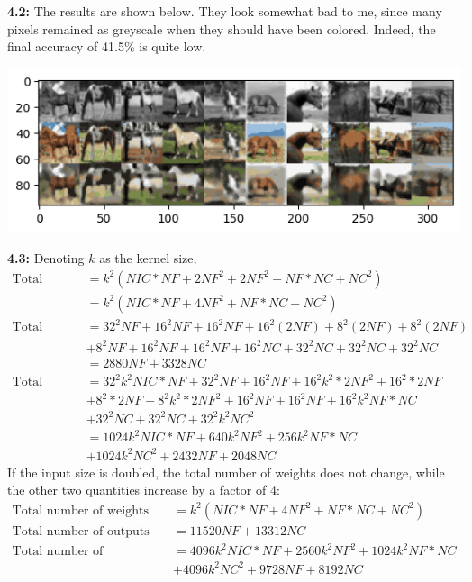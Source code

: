 \documentclass[12pt]{article}
\begin{document}
\textbf{4.2:} The results are shown below. They look somewhat bad to me, since many pixels remained as greyscale when they should have been colored. Indeed, the final accuracy of 41.5\% is quite low.
\begin{center}
    \includegraphics[scale=.75]{4.2.png}
\end{center}

\textbf{4.3:} Denoting $k$ as the kernel size, \begin{align*}
    \text{Total number of weights} &= k^2(NIC*NF + 2NF^2 + 2NF^2 + NF*NC + NC^2)\\
    &= k^2(NIC*NF + 4NF^2 + NF*NC + NC^2)\\
    \text{Total number of outputs} &= 32^2NF + 16^2NF + 16^2NF + 16^2(2NF) + 8^2(2NF) + 8^2(2NF)\\
    &+ 8^2NF + 16^2NF + 16^2NF + 16^2NC + 32^2NC + 32^2NC + 32^2NC\\
    &= 2880NF + 3328NC\\
    \text{Total number of connections} &= 32^2k^2NIC*NF + 32^2NF + 16^2NF + 16^2k^2*2NF^2 + 16^2*2NF\\
    &+ 8^2*2NF + 8^2k^2*2NF^2 + 16^2NF + 16^2NF + 16^2k^2NF*NC\\
    &+ 32^2NC + 32^2NC + 32^2k^2NC^2\\
    &= 1024k^2NIC*NF + 640k^2NF^2 + 256k^2NF*NC\\
    &+ 1024k^2NC^2 + 2432NF + 2048NC
\end{align*} If the input size is doubled, the total number of weights does not change, while the other two quantities increase by a factor of 4:\begin{align*}
    \text{Total number of weights} &= k^2(NIC*NF + 4NF^2 + NF*NC + NC^2)\\
    \text{Total number of outputs} &= 11520NF + 13312NC\\
    \text{Total number of connections} &= 4096k^2NIC*NF + 2560k^2NF^2 + 1024k^2NF*NC\\
    &+ 4096k^2NC^2 + 9728NF + 8192NC
\end{align*}
\end{document}
